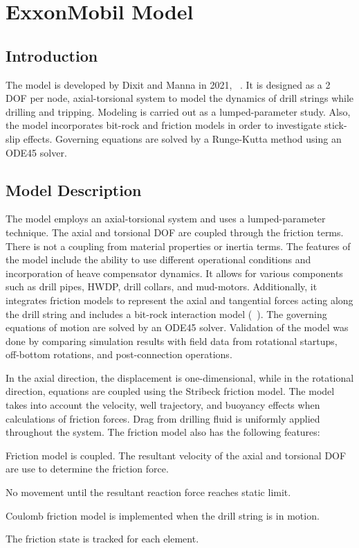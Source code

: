 \chapter{ExxonMobil Model}
\label{ch:exxonmobilmodel}

\section{Introduction}
The model is developed by Dixit and Manna in 2021, ~\cite{ref:dixit2021a}. It is designed as a 2 DOF per node, axial-torsional system to model the dynamics of drill strings while drilling and tripping. Modeling is carried out as a lumped-parameter study. Also, the model incorporates bit-rock and friction models in order to investigate stick-slip effects. Governing equations are solved by a Runge-Kutta method using an ODE45 solver. 

\section{Model Description}
The model employs an axial-torsional system and uses a lumped-parameter technique.  The axial and torsional DOF are coupled through the friction terms.  There is not a coupling from material properties or inertia terms.  The features of the model include the ability to use different operational conditions and incorporation of heave compensator dynamics.  It allows for various components such as drill pipes, HWDP, drill collars, and mud-motors. Additionally, it integrates friction models to represent the axial and tangential forces acting along the drill string and includes a bit-rock interaction model (~\cite{ref:cayeux2020a}). The governing equations of motion are solved by an ODE45 solver. Validation of the model was done by comparing simulation results with field data from rotational startups, off-bottom rotations, and post-connection operations. 

In the axial direction, the displacement is one-dimensional, while in the rotational direction, equations are coupled using the Stribeck friction model. The model takes into account the velocity, well trajectory, and buoyancy effects when calculations of friction forces. Drag from drilling fluid is uniformly applied throughout the system. The friction model also has the following features:
\begin{bulletedlist}
    \item Friction model is coupled.  The resultant velocity of the axial and torsional DOF are use to determine the friction force.
    \item No movement until the resultant reaction force reaches static limit.
    \item Coulomb friction model is implemented when the drill string is in motion.
    \item The friction state is tracked for each element.
\end{bulletedlist}

